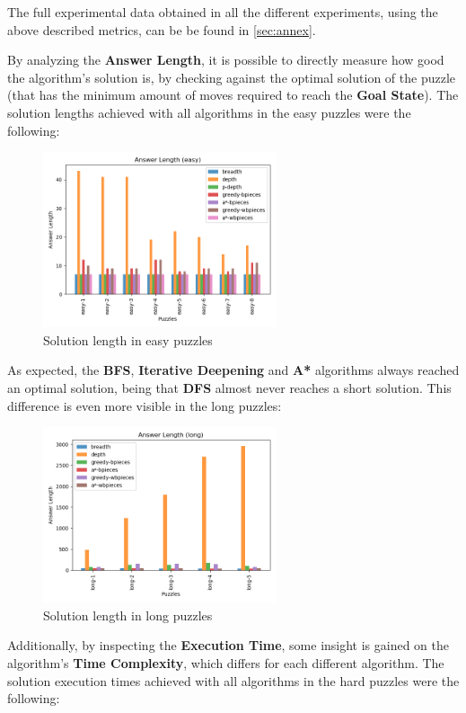 \documentclass[conference]{IEEEtran}
\begin{document}
The full experimental data obtained in all the different experiments, using the above described metrics, can be be found in \autoref{sec:annex}.

By analyzing the \textbf{Answer Length}, it is possible to directly measure how good the algorithm's solution is, by checking against the optimal solution of the puzzle (that has the minimum amount of moves required to reach the \textbf{Goal State}). The solution lengths achieved with all algorithms in the easy puzzles were the following:

\begin{figure}[H]
    \centerline{\includegraphics[width=260px]{../../graphics/answerLength-easy.png}}
    \caption{Solution length in easy puzzles}
\end{figure}

As expected, the \textbf{BFS}, \textbf{Iterative Deepening} and \textbf{A*} algorithms always reached an optimal solution, being that \textbf{DFS} almost never reaches a short solution. This difference is even more visible in the long puzzles:

\begin{figure}[H]
    \centerline{\includegraphics[width=260px]{../../graphics/answerLength-long.png}}
    \caption{Solution length in long puzzles}
\end{figure}

Additionally, by inspecting the \textbf{Execution Time}, some insight is gained on the algorithm's \textbf{Time Complexity}, which differs for each different algorithm. The solution execution times achieved with all algorithms in the hard puzzles were the following:
\end{document}
